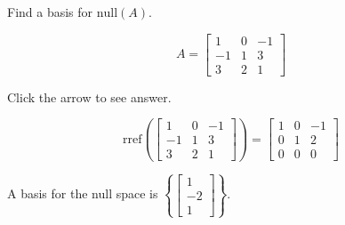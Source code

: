 \documentclass{ximera}
\begin{document}
\begin{problem}\label{prb:5.38a} Find a basis for $\mbox{null} \left(A \right)$.

$$A = \left[ \begin{array}{rrr}
1 & 0 & -1 \\
-1 & 1 & 3 \\
3 & 2 & 1
\end{array} \right]$$

Click the arrow to see answer.

\begin{expandable}{}{}
    $$\text{rref}\left(\left[ \begin{array}{rrr}
1 & 0 & -1 \\
-1 & 1 & 3 \\
3 & 2 & 1
\end{array} \right]\right)=\begin{bmatrix}
    1& 0& -1\\
 0 &1& 2\\
 0& 0& 0
\end{bmatrix}$$

A basis for the null space is $\left\{\begin{bmatrix}
     1\\-2\\1
 \end{bmatrix}\right\}$.
\end{expandable}
\end{problem}
\end{document}
